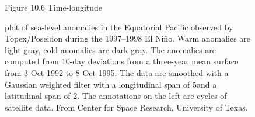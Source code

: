 \begin{figure}[t!]
\footnotesize
Figure 10.6 Time-longitude \rule{0pt}{3ex}plot of sea-level
anomalies in the Equatorial Pacific observed by
Topex/Poseidon during the 1997--1998  El Ni\~{n}o. Warm anomalies are light gray, cold anomalies are dark
gray. The anomalies are computed from 10-day deviations from a three-year mean surface from 3
Oct 1992 to 8 Oct 1995. The data are smoothed with a Gaussian weighted filter with a
longitudinal span of 5\degrees and a latitudinal span of 2\degrees. The annotations on the
left are cycles of satellite data. From Center for Space Research, University of Texas.
\label{texas-may01}
\vspace{-3ex}
\end{figure}

\vspace{-1ex}

